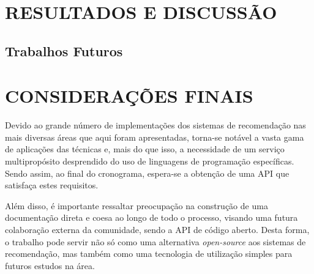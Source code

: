 \documentclass[12pt, openright, oneside, a4paper, brazil]{abntex2}
\begin{document}
%
%

\chapter{RESULTADOS E DISCUSSÃO}

\section{Trabalhos Futuros} \label{trabalhos_futuros}

\chapter{CONSIDERAÇÕES FINAIS}

Devido ao grande número de implementações dos sistemas de recomendação nas mais diversas áreas que aqui foram apresentadas, torna-se notável a vasta gama de aplicações das técnicas e, mais do que isso, a necessidade de um serviço multipropósito desprendido do uso de linguagens de programação específicas. Sendo assim, ao final do cronograma, espera-se a obtenção de uma API que satisfaça estes requisitos.

Além disso, é importante ressaltar preocupação na construção de uma documentação direta e coesa ao longo de todo o processo, visando uma futura colaboração externa da comunidade, sendo a API de código aberto. Desta forma, o trabalho pode servir não só como uma alternativa \textit{open-source} aos sistemas de recomendação, mas também como uma tecnologia de utilização simples para futuros estudos na área.

\postextual


\end{document}
